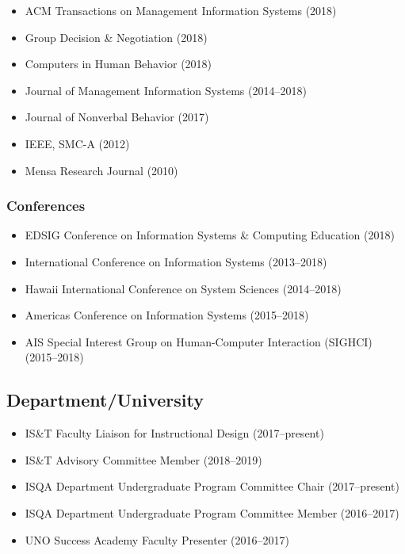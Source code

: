 \documentclass[10pt, letter]{article}
\begin{document}
\begin{itemize}
\itemsep0em
\item ACM Transactions on Management Information Systems (2018)
\item Group Decision \& Negotiation (2018)
\item Computers in Human Behavior (2018)
\item Journal of Management Information Systems (2014--2018)
\item Journal of Nonverbal Behavior (2017)
\item IEEE, SMC-A (2012)
\item Mensa Research Journal (2010)
\end{itemize}

\subsubsection*{Conferences}

\begin{itemize}
\itemsep0em
\item EDSIG Conference on Information Systems \& Computing Education (2018)
\item International Conference on Information Systems (2013--2018)
\item Hawaii International Conference on System Sciences (2014--2018)
\item Americas Conference on Information Systems (2015--2018)
\item AIS Special Interest Group on Human-Computer Interaction (SIGHCI) (2015--2018)
\end{itemize}

\subsection*{Department/University}

\begin{itemize}
\itemsep0em
\item IS\&T Faculty Liaison for Instructional Design (2017--present)
\item IS\&T Advisory Committee Member (2018--2019)
\item ISQA Department Undergraduate Program Committee Chair (2017--present)
\item ISQA Department Undergraduate Program Committee Member (2016--2017)
\item UNO Success Academy Faculty Presenter (2016--2017)
\end{itemize}
\end{document}
